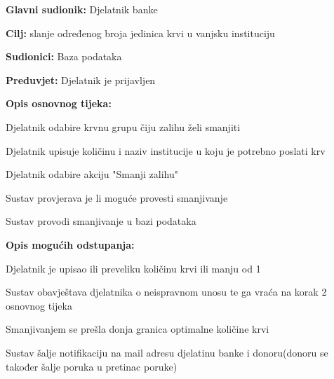 \noindent {}
					\begin{packed_item}
	
						\item \textbf{Glavni sudionik: }Djelatnik banke
						\item \textbf{Cilj:} slanje određenog broja jedinica krvi u vanjsku instituciju
						\item \textbf{Sudionici:} Baza podataka
						\item \textbf{Preduvjet:} Djelatnik je prijavljen
						\item \textbf{Opis osnovnog tijeka:}
						
						\item[] \begin{packed_enum}
	
							\item Djelatnik odabire krvnu grupu čiju zalihu želi smanjiti
							\item Djelatnik upisuje količinu i naziv institucije u koju je potrebno poslati krv
							\item Djelatnik odabire akciju "Smanji zalihu"
							\item Sustav provjerava je li moguće provesti smanjivanje
							\item Sustav provodi smanjivanje u bazi podataka
						\end{packed_enum}
						\item  \textbf{Opis mogućih odstupanja:}
						
						\item[] \begin{packed_item}
							\item[4.a] Djelatnik je upisao ili preveliku količinu krvi ili manju od 1				
							\item[] \begin{packed_enum}
								
								\item  Sustav obavještava djelatnika o neispravnom unosu te ga vraća na korak 2 osnovnog tijeka
									\end{packed_enum}
							\item[5.a] Smanjivanjem se prešla donja granica optimalne količine krvi
							\item[] \begin{packed_enum}
								
								\item  Sustav šalje notifikaciju na mail adresu djelatinu banke i donoru(donoru se također šalje poruka u pretinac poruke)
							 

								
									\end{packed_enum}
								\end{packed_item}			
									
									
									
					\end{packed_item}
				



